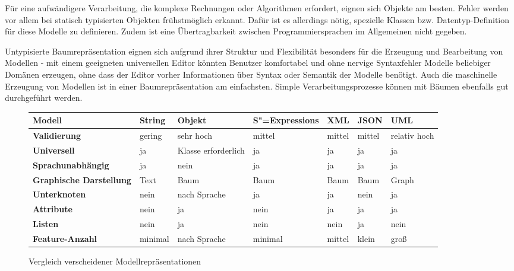 \documentclass[11pt, a4paper, bibgerm]{scrbook}
\newcommand{\sexps}{S"=Expressions}
\begin{document}
Für eine aufwändigere Verarbeitung, die komplexe Rechnungen oder
Algorithmen erfordert, eignen sich Objekte am besten. Fehler werden vor
allem bei statisch typisierten Objekten frühstmöglich erkannt. Dafür ist
es allerdings nötig, spezielle Klassen bzw. Datentyp-Definition für
diese Modelle zu definieren. Zudem ist eine Übertragbarkeit zwischen
Programmiersprachen im Allgemeinen nicht gegeben.

Untypisierte Baumrepräsentation eignen sich aufgrund ihrer Struktur und
Flexibilität besonders für die Erzeugung und Bearbeitung von Modellen -
mit einem geeigneten universellen Editor könnten Benutzer komfortabel
und ohne nervige Syntaxfehler Modelle beliebiger Domänen erzeugen, ohne
dass der Editor vorher Informationen über Syntax oder Semantik der
Modelle benötigt. Auch die maschinelle Erzeugung von Modellen ist in
einer Baumrepräsentation am einfachsten. Simple Verarbeitungsprozesse
können mit Bäumen ebenfalls gut durchgeführt werden.

\begin{figure}
  \centering
\begin{tabular}{|l|l|l|l|l|l|l|}\hline
\bf Modell                 & \bf String & \bf Objekt           & \bf \sexps{} & \bf XML & \bf JSON & \bf UML         \\\hline\hline
\bf Validierung            & gering     & sehr hoch            & mittel       & mittel  & mittel   & relativ hoch    \\\hline
\bf Universell             & ja         & Klasse erforderlich  & ja           & ja      & ja       & ja              \\\hline
\bf Sprachunabhängig       & ja         & nein                 & ja           & ja      & ja       & ja              \\\hline
\bf Graphische Darstellung & Text       & Baum                 & Baum         & Baum    & Baum     & Graph           \\\hline
\bf Unterknoten            & nein       & nach Sprache         & ja           & ja      & nein     & ja              \\\hline
\bf Attribute              & nein       & ja                   & nein         & ja      & ja       & ja              \\\hline
\bf Listen                 & nein       & ja                   & nein         & nein    & ja       & nein            \\\hline
\bf Feature-Anzahl         & minimal    & nach Sprache         & minimal      & mittel  & klein    & groß            \\\hline
\end{tabular}
  \caption{Vergleich verscheidener Modellrepräsentationen}
  \label{magicl:fig:model_sum}
\end{figure}
\end{document}
